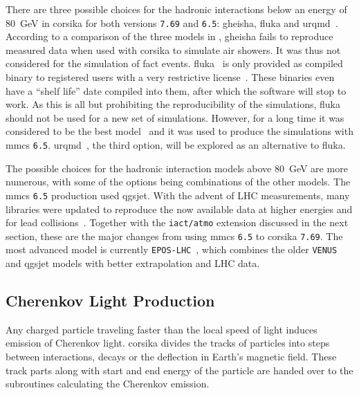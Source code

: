 There are three possible choices for the hadronic interactions below an energy of
\SI{80}{\GeV} in \gls{corsika} 
for both versions \texttt{7.69} and \texttt{6.5}: \gls{gheisha}, \gls{fluka} and \gls{urqmd}~\cite{corsika_manual_769}.
According to a comparison of the three models in \cite{model_comp_auger}, \gls{gheisha} fails to reproduce measured data when used with \gls{corsika} to simulate air showers.
It was thus not considered for the simulation of \gls{fact} events.
\gls{fluka}~\cite{fluka} is only provided as compiled binary to registered users with a very restrictive
license~\cite{fluka-license}.
These binaries even have a \enquote{shelf life} date compiled into them,
after which the software will stop to work.
As this is all but prohibiting the reproducibility of the simulations, 
\gls{fluka} should not be used for a new set of simulations.
However, for a long time it was considered to be the best model~\cite{model_comp_auger} and it was used
to produce the simulations with \gls{mmcs} \texttt{6.5}.
\gls{urqmd}~\cite{urqmd}, the third option, will be explored as an alternative to 
\gls{fluka}.

The possible choices for the hadronic interaction models above \SI{80}{\GeV} are more numerous,
with some of the options being combinations of the other models.
The \gls{mmcs} \texttt{6.5} production used \gls{qgsjet}.
With the advent of \gls{LHC} measurements, many libraries were updated to reproduce the 
now available data at higher energies and for lead collisions~\cite{epos-lhc}. 
Together with the \texttt{iact/atmo} extension discussed in the next section,
these are the major changes from using \gls{mmcs} \texttt{6.5} to \gls{corsika} \texttt{7.69}.
The most advanced model is currently \texttt{EPOS-LHC}~\cite{epos-lhc}, which combines the older
\texttt{VENUS} and \gls{qgsjet} models with better extrapolation and \gls{LHC} data.


\subsection{Cherenkov Light Production}\label{sec:corsika-cherenkov}

Any charged particle traveling faster than the local speed of light induces
emission of Cherenkov light.
\gls{corsika} divides the tracks of particles into steps between interactions,
decays or the deflection in Earth's magnetic field.
These track parts along with start and end energy of the particle are
handed over to the subroutines calculating the Cherenkov emission.


